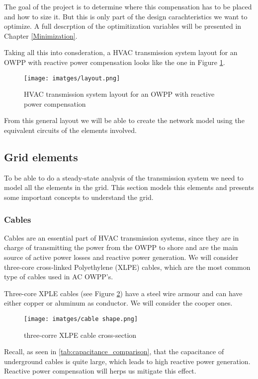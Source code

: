 \documentclass[a4paper,11pt, titlepage, twoside]{article}
\begin{document}
The goal of the project is to determine where this compensation has to be placed  and how to size it. But this is only part of the design carachteristics we want to optimize. A full descrption of the optimitization variables will be
presented in Chapter \ref{Minimization}.

Taking all this into consderation, a HVAC transmission system layout for an OWPP with reactive power compensation looks like the one in Figure \ref{fig:fulltransmission}.
\begin{figure}[H] %
    \centering
    \texttt{[image: imatges/layout.png]}
    \caption{HVAC transmission system layout for an OWPP with reactive power compensation\cite{paperbase}}
    \label{fig:fulltransmission} %
\end{figure}

From this general layout we will be able to create the network model using the equivalent circuits of the  elements involved.

\subsection{Grid elements}

To be able to do a steady-state analysis of the transmission system we need to model all the elements in the grid. This section models this elements and presents
some important concepts to understand the grid.




\subsubsection{Cables}

Cables are an essential part of HVAC transmission systems, since they are in charge of transmitting the power from the OWPP to
shore and are the main source of active power losses and reactive power generation. We will consider  three-core cross-linked Polyethylene (XLPE) cables, which are the most common type of cables used in  AC OWPP's. \par

Three-core XPLE cables (see Figure \ref{fig:cableshape}) have a steel wire armour and can have either copper or aluminum as conductor. We will consider the cooper ones. 

\begin{figure}[H]
    \centering
    \texttt{[image: imatges/cable shape.png]}
    \caption{three-corre XLPE cable cross-section \cite{ABB}}
	\label{fig:cableshape}
\end{figure}
Recall, as seen in \ref{tab:capacitance_comparison}, that the capacitance of underground cables is quite large, which leads to high reactive power generation. Reactive power compensation will
herps us mitigate this effect.\par
\end{document}
